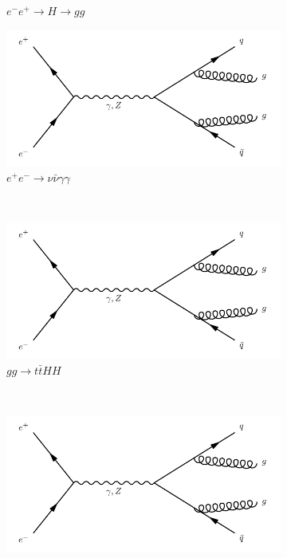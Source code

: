 \begin{figure}[h]
\begin{subfigure}[b]{0.3\textwidth}
    \caption{$e^-e^+\rightarrow H \rightarrow gg$}
    \label{fey:12}
  \end{subfigure}
  \newline
  \newline
  \begin{subfigure}[b]{0.3\textwidth}
    \includegraphics[width=\textwidth]{../Diagrams/D1.pdf}
    \caption{$e^+e^- \rightarrow \nu\bar{\nu}\gamma\gamma$}
    \label{fey:13}
  \end{subfigure}%
  ~
  \begin{subfigure}[b]{0.3\textwidth}
    \includegraphics[width=\textwidth]{../Diagrams/D1.pdf}
    \caption{$gg\rightarrow t\bar{t}HH$}
    \label{fey:14}
  \end{subfigure}%
  ~
  \begin{subfigure}[b]{0.3\textwidth}
    \includegraphics[width=\textwidth]{../Diagrams/D1.pdf}

\end{subfigure}
\end{figure}

